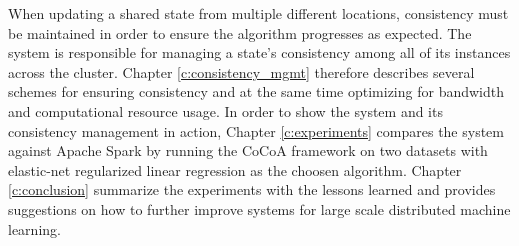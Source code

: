 When updating a shared state from multiple different locations, consistency must be maintained in order to ensure the algorithm progresses as expected. The system is responsible for managing a state's consistency among all of its instances across the cluster. Chapter \ref{c:consistency_mgmt} therefore describes several schemes for ensuring consistency and at the same time optimizing for bandwidth and computational resource usage.
In order to show the system and its consistency management in action, Chapter \ref{c:experiments} compares the system against Apache Spark by running the CoCoA framework on two datasets with elastic-net regularized linear regression as the choosen algorithm.
Chapter \ref{c:conclusion} summarize the experiments with the lessons learned and provides suggestions on how to further improve systems for large scale distributed machine learning.

